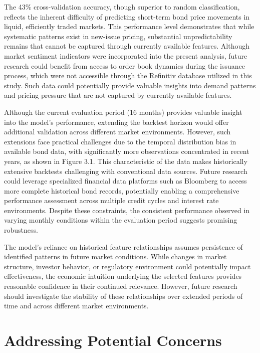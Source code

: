 The 43\% cross-validation accuracy, though superior to random classification, reflects the inherent difficulty of predicting short-term bond price movements in liquid, efficiently traded markets. This performance level demonstrates that while systematic patterns exist in new-issue pricing, substantial unpredictability remains that cannot be captured through currently available features. Although market sentiment indicators were incorporated into the present analysis, future research could benefit from access to order book dynamics during the issuance process, which were not accessible through the Refinitiv database utilized in this study. Such data could potentially provide valuable insights into demand patterns and pricing pressure that are not captured by currently available features.

Although the current evaluation period (16 months) provides valuable insight into the model's performance, extending the backtest horizon would offer additional validation across different market environments. However, such extensions face practical challenges due to the temporal distribution bias in available bond data, with significantly more observations concentrated in recent years, as shown in Figure 3.1. This characteristic of the data makes historically extensive backtests challenging with conventional data sources. Future research could leverage specialized financial data platforms such as Bloomberg to access more complete historical bond records, potentially enabling a comprehensive performance assessment across multiple credit cycles and interest rate environments. Despite these constraints, the consistent performance observed in varying monthly conditions within the evaluation period suggests promising robustness.

The model's reliance on historical feature relationships assumes persistence of identified patterns in future market conditions. While changes in market structure, investor behavior, or regulatory environment could potentially impact effectiveness, the economic intuition underlying the selected features provides reasonable confidence in their continued relevance. However, future research should investigate the stability of these relationships over extended periods of time and across different market environments.

\section{Addressing Potential Concerns}

